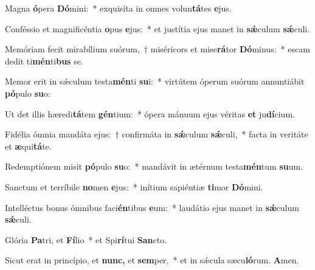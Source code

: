 \item Magna \textbf{ó}pera \textbf{Dó}mini:~* exquisíta in omnes volun\textbf{tá}tes \textbf{e}jus.
\item Conféssio et magnificéntia \textbf{o}pus \textbf{e}jus:~* et justítia ejus manet in \textbf{sǽ}culum \textbf{sǽ}culi.
\item Memóriam fecit mirabílium suórum,~† miséricors et mise\textbf{rá}tor \textbf{Dó}minus:~* escam dedit ti\textbf{mén}ti\textbf{bus} se.
\item Memor erit in sǽculum testa\textbf{mén}ti \textbf{su}i:~* virtútem óperum suórum annuntiábit \textbf{pó}pulo \textbf{su}o:
\item Ut det illis hæredi\textbf{tá}tem \textbf{gén}tium:~* ópera mánuum ejus véritas \textbf{et} ju\textbf{dí}cium.
\item Fidélia ómnia mandáta ejus:~† confirmáta in \textbf{sǽ}culum \textbf{sǽ}culi,~* facta in veritáte et \textbf{æ}qui\textbf{tá}te.
\item Redemptiónem misit \textbf{pó}pulo \textbf{su}o:~* mandávit in ætérnum testa\textbf{mén}tum \textbf{su}um.
\item Sanctum et terríbile \textbf{no}men \textbf{e}jus:~* inítium sapiéntiæ \textbf{ti}mor \textbf{Dó}mini.
\item Intelléctus bonus ómnibus faci\textbf{én}tibus \textbf{e}um:~* laudátio ejus manet in \textbf{sǽ}culum \textbf{sǽ}culi.
\item Glória \textbf{Pa}tri, et \textbf{Fí}lio~* et Spi\textbf{rí}tui \textbf{San}cto.
\item Sicut erat in princípio, et \textbf{nunc,} et \textbf{sem}per,~* et in sǽcula sæcu\textbf{ló}rum. \textbf{A}men.